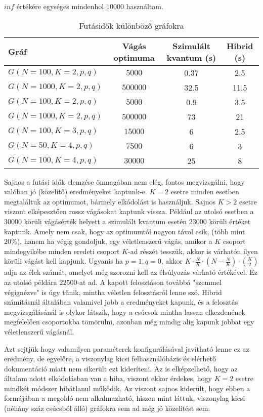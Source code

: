 $inf$ értékére egységes mindenhol $10000$ használtam.

\begin{table}[ht]
	\footnotesize
	\centering
	\begin{tabular}{ l c c c }
		\toprule
		Gráf & Vágás optimuma & Szimulált kvantum (s) & Hibrid (s) \\
		\midrule
		$G(N=100, K=2, p, q)$ & $5000$ & 0.37 & 2.5   \\
		$G(N=1000, K=2, p, q)$ & $500000$ & 32.5 & 11.5 \\
		$G(N=100, K=2, p, q)$ & $5000$ & 0.9 & 3.5  \\
		$G(N=1000, K=2, p, q)$ & $500000$ & 73 & 21 \\	
		$G(N=100, K=3, p, q)$ & $15000$ & 6 & 2.5 \\		
		$G(N=50, K=4, p, q)$ & $7500$ & 6 & 3 \\		
		$G(N=100, K=4, p, q)$ & $30000$ & 25 & 8 \\

		\bottomrule
	\end{tabular}
	\caption{Futásidők különböző gráfokra}
	\label{tab:TabularExample}
\end{table}

Sajnos a futási idők elemzése önmagában nem elég, fontos megvizsgálni, hogy valóban jó (közelítő) eredményeket kaptunk-e. $K=2$ esetre minden esetben megtaláltuk az optimumot, bármely elkódolást is használjuk.
Sajnos $K>2$ esetre viszont elképesztően rossz vágásokat kaptunk vissza. Például az utolsó esetben a 30000 körüli vágásérték helyett a szimulált kvantum esetén 23000 körüli értéket kaptunk. Amely nem csak, hogy az optimumtól nagyon távol esik, (több mint $20\%$), hanem ha végig gondoljuk, egy véletlenszerű vágás, amikor a $K$ csoport mindegyikébe minden eredeti csoport $K$-ad részét tesszük, akkor is várhatón ilyen körüli vágást kell kapjunk. Ugyanis ha $p=1, q=0$, akkor $K \cdot \frac{N}{K} \cdot (N-\frac{N}{K}) \cdot \binom{K}{2}$ adja az élek számát, amelyet még szorozni kell az élsúlyozás várható értékével. Ez az utolsó példára $22500$-at ad. A kapott felosztáson továbbá "szemmel végignézve" is úgy tűnik, mintha véletlen felosztásról lenne szó.
Hibrid számításnál általában valamivel jobb a eredményeket kapunk, és a felosztás megvizsgálásánál is olykor látszik, hogy a csúcsok mintha lassan elkezdenének megfelelően csoportokba tömörülni, azonban még mindig alig kapunk jobbat egy véletlenszerű vágásnál.

Azt sejtjük hogy valamilyen paraméterek konfigurálásával javítható lenne ez az eredmény, de egyelőre, a viszonylag kicsi felhasználóbázis és elérhető dokumentáció miatt nem sikerült ezt kideríteni. Az is elképzelhető, hogy az általam adott elkódolásban van a hiba, viszont ekkor érdekes, hogy $K=2$ esetre mindkét módszer hibátlanul működik.  Az viszont sajnos kiderült, hogy ebben a formájában a megoldó nem alkalmazható, hiszen mint láttuk, viszonylag kicsi (néhány száz csúcsból álló) gráfokra sem ad még jó közelítést sem.

